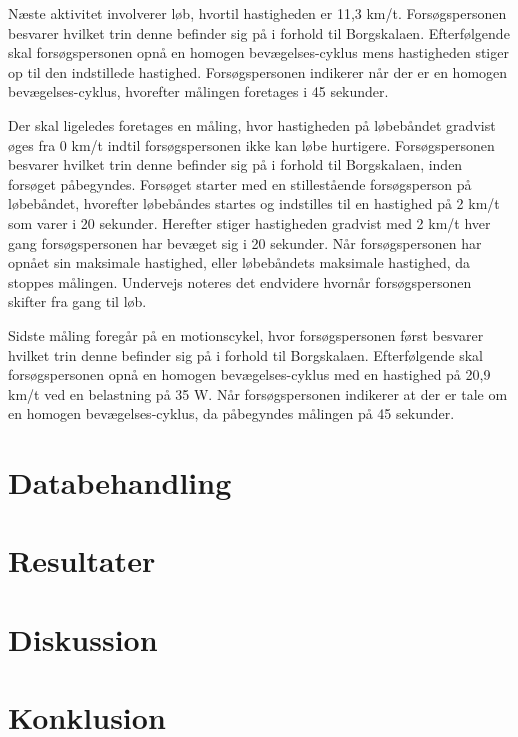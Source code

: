 Næste aktivitet involverer løb, hvortil hastigheden er 11,3 km/t. Forsøgspersonen besvarer hvilket trin denne befinder sig på i forhold til Borgskalaen. Efterfølgende skal forsøgspersonen opnå en homogen bevægelses-cyklus mens hastigheden stiger op til den indstillede hastighed. Forsøgspersonen indikerer når der er en homogen bevægelses-cyklus, hvorefter målingen foretages i 45 sekunder. 

Der skal ligeledes foretages en måling, hvor hastigheden på løbebåndet gradvist øges fra 0 km/t indtil forsøgspersonen ikke kan løbe hurtigere. Forsøgspersonen besvarer hvilket trin denne befinder sig på i forhold til Borgskalaen, inden forsøget påbegyndes. \newline
Forsøget starter med en stillestående forsøgsperson på løbebåndet, hvorefter løbebåndes startes og indstilles til en hastighed på 2 km/t som varer i 20 sekunder. Herefter stiger hastigheden gradvist med 2 km/t hver gang forsøgspersonen har bevæget sig i 20 sekunder. Når forsøgspersonen har opnået sin maksimale hastighed, eller løbebåndets maksimale hastighed, da stoppes målingen. Undervejs noteres det endvidere hvornår forsøgspersonen skifter fra gang til løb. 

Sidste måling foregår på en motionscykel, hvor forsøgspersonen først besvarer hvilket trin denne befinder sig på i forhold til Borgskalaen. Efterfølgende skal forsøgspersonen opnå en homogen bevægelses-cyklus med en hastighed på 20,9 km/t ved en belastning på 35 W. Når forsøgspersonen indikerer at der er tale om en homogen bevægelses-cyklus, da påbegyndes målingen på 45 sekunder. 


\section{Databehandling}

\section{Resultater}

\section{Diskussion}

\section{Konklusion}

